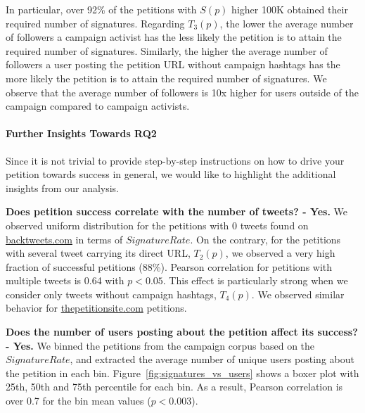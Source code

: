 In particular, over 92\% of the petitions with $S(p)$ higher 100K obtained their required number of signatures.
Regarding $T_3(p)$, the lower the average number of followers a campaign activist has the less likely the petition is to attain the required number of signatures.
Similarly, the higher the average number of followers a user posting the petition URL without campaign hashtags has the more likely the petition is to attain the required number of signatures.
We observe that the average number of followers is 10x higher for users outside of the campaign compared to campaign activists. 

\paragraph{Further Insights Towards RQ2}
Since it is not trivial to provide step-by-step instructions on how to drive your petition towards success in general, we would like to highlight the additional insights from our analysis.


\textbf{Does petition success correlate with the number of tweets? - Yes.} We observed uniform distribution for the petitions with 0 tweets found on \url{backtweets.com} in terms of $SignatureRate$. On the contrary, for the petitions with several tweet carrying its direct URL, $T_2(p)$, we observed a very high fraction of successful petitions (88\%). Pearson correlation for petitions with multiple tweets is 0.64 with \(p < 0.05\). This effect is particularly strong when we consider only tweets without campaign hashtags, $T_4(p)$. We observed similar behavior for \url{thepetitionsite.com} petitions.

\textbf{Does the number of users posting about the petition affect its success? - Yes.} We binned the petitions from the campaign corpus based on the $SignatureRate$, and extracted the average number of unique users posting about the petition in each bin. Figure~\ref{fig:signatures_vs_users} shows a boxer plot with 25th, 50th and 75th percentile for each bin. As a result, Pearson correlation is over 0.7 for the bin mean values (\(p < 0.003\)).

